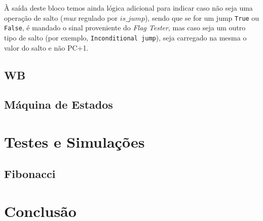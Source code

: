 \documentclass[a4paper]{article}
\begin{document}
				À saída deste bloco temos ainda lógica adicional para indicar caso não seja uma operação de salto (\textit{mux} regulado por $is\_jump$), sendo que se for um jump \texttt{True} ou \texttt{False}, é mandado o sinal proveniente do \emph{Flag Tester}, mas caso seja um outro tipo de salto (por exemplo, \texttt{Inconditional jump}), seja carregado na mesma o valor do salto e não PC+1.
			
		\subsection{WB}
		
		\subsection{Máquina de Estados}
		
	\section{Testes e Simulações}
	
		\subsection{Fibonacci}
		
	\section{Conclusão}
	
\end{document}
